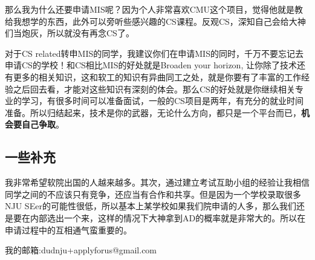 那么我为什么还要申请MIS呢？因为个人非常喜欢CMU这个项目，觉得他就是教给我想学的东西，此外可以旁听些感兴趣的CS课程。反观CS，深知自己会给大神们当炮灰，所以就没有再念CS了。\par

对于CS related转申MIS的同学，我建议你们在申请MIS的同时，千万不要忘记去申请CS的学校！和CS相比MIS的好处就是Broaden your horizon, 让你除了技术还有更多的相关知识，这和软工的知识有异曲同工之处，就是你要有了丰富的工作经验之后回去看，才能对这些知识有深刻的体会。那么CS的好处就是你继续相关专业的学习，有很多时间可以准备面试，一般的CS项目是两年，有充分的就业时间准备。所以归结起来，技术是你的武器，无论什么方向，都只是一个平台而已，\textbf{机会要自己争取}。

\subsection{一些补充}
我非常希望软院出国的人越来越多。其次，通过建立考试互助小组的经验让我相信同学之间的不应该只有竞争，还应当有合作和共享。但是因为一个学校录取很多NJU SEer的可能性很低，所以基本上某学校如果我们院申请的人多，那么我们还是要在内部选出一个来，这样的情况下大神拿到AD的概率就是非常大的。所以在申请过程中的互相通气蛮重要的。

我的邮箱:dudnju+applyforus@gmail.com
